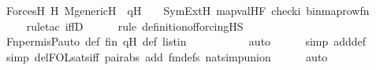 \begin{isabellebody}
\ ForcesH{}{\isacharcolon}{\kern0pt}\ {\isachardoublequoteopen}{\isacharparenleft}{\kern0pt}{\isasymforall}H{\isachardot}{\kern0pt}\ M{\isacharunderscore}{\kern0pt}generic{\isacharparenleft}{\kern0pt}H{\isacharparenright}{\kern0pt}\ {\isasymand}\ q{\isasymin}H\ \ {\isasymlongrightarrow}\ \ SymExt{\isacharparenleft}{\kern0pt}H{\isacharparenright}{\kern0pt}{\isacharcomma}{\kern0pt}\ map{\isacharparenleft}{\kern0pt}val{\isacharparenleft}{\kern0pt}H{\isacharparenright}{\kern0pt}{\isacharcomma}{\kern0pt}{\isacharbrackleft}{\kern0pt}F{\isacharprime}{\kern0pt}{\isacharcomma}{\kern0pt}\ check{\isacharparenleft}{\kern0pt}i{\isacharparenright}{\kern0pt}{\isacharcomma}{\kern0pt}\ binmap{\isacharunderscore}{\kern0pt}row{\isacharprime}{\kern0pt}{\isacharparenleft}{\kern0pt}f{\isacharbackquote}{\kern0pt}n{\isacharparenright}{\kern0pt}{\isacharbrackright}{\kern0pt}{\isacharparenright}{\kern0pt}\ {\isasymTurnstile}\ {\isasymphi}{\isacharparenright}{\kern0pt}{\isachardoublequoteclose}\isanewline
\ \ \ \ \isamarkupfalse%
{\isacharparenleft}{\kern0pt}rule{\isacharunderscore}{\kern0pt}tac\ iffD{}{\isacharparenright}{\kern0pt}\isanewline
\ \ \ \ \ \isamarkupfalse%
{\isacharparenleft}{\kern0pt}rule\ definition{\isacharunderscore}{\kern0pt}of{\isacharunderscore}{\kern0pt}forcing{\isacharunderscore}{\kern0pt}HS{\isacharparenright}{\kern0pt}\isanewline
\ \ \ \ \isamarkupfalse%
\ Fn{\isacharunderscore}{\kern0pt}perm{\isacharprime}{\kern0pt}{\isacharunderscore}{\kern0pt}is{\isacharunderscore}{\kern0pt}P{\isacharunderscore}{\kern0pt}auto\ {\isasympi}{\isacharunderscore}{\kern0pt}def\ fin\ qH\ {\isasymphi}{\isacharunderscore}{\kern0pt}def\ listin{\isacharprime}{\kern0pt}{\isacharprime}{\kern0pt}{\isacharprime}{\kern0pt}\isanewline
\ \ \ \ \ \ \ \ \ \isamarkupfalse%
\ auto{\isacharbrackleft}{\kern0pt}{}{\isacharbrackright}{\kern0pt}\isanewline
\ \ \ \ \ \isamarkupfalse%
{\isacharparenleft}{\kern0pt}simp\ add{\isacharcolon}{\kern0pt}{\isasymphi}{\isacharunderscore}{\kern0pt}def{\isacharparenright}{\kern0pt}\isanewline
\ \ \ \ \ \isamarkupfalse%
\ {\isacharparenleft}{\kern0pt}simp\ del{\isacharcolon}{\kern0pt}FOL{\isacharunderscore}{\kern0pt}sats{\isacharunderscore}{\kern0pt}iff\ pair{\isacharunderscore}{\kern0pt}abs\ add{\isacharcolon}{\kern0pt}\ fm{\isacharunderscore}{\kern0pt}defs\ nat{\isacharunderscore}{\kern0pt}simp{\isacharunderscore}{\kern0pt}union{\isacharparenright}{\kern0pt}\isanewline
\ \ \ \ \isamarkupfalse%
\ auto\isanewline

\end{isabellebody}
